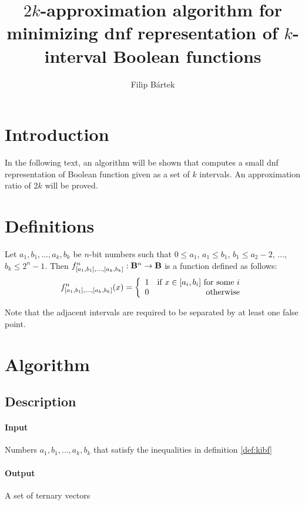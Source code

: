 \documentclass{article}
\author{Filip Bártek}
\title{$2k$-approximation algorithm
for minimizing \acrshort{dnf} representation
of $k$-interval Boolean functions}
\begin{document}
\maketitle

\section{Introduction}
In the following text,
an algorithm will be shown that computes
a small \acrshort{dnf} representation
of Boolean function given as a set of $k$ intervals.
An approximation ratio of $2k$ will be proved.

\section{Definitions}

\begin{definition}
\label{def:kibf}
Let $a_1, b_1, \ldots, a_k, b_k$ be $n$-bit numbers
such that $0 \leq a_1$,
$a_1 \leq b_1$,
$b_1 \leq a_2 - 2$,
$\ldots$,
$b_k \leq 2^n - 1$.
Then $f^n_{[a_1, b_1], \ldots, [a_k, b_k]}: \mathbf{B}{}^n \rightarrow \mathbf{B}{}$ is a function defined as follows:
\[f^n_{\interval{a_1}{b_1}, \ldots, \interval{a_k}{b_k}} (x) = \left\{
  \begin{array}{lr}
    1 & $if $ x \in \interval{a_i}{b_i}$ for some $i\\
    0 & $otherwise$
  \end{array}
\right.
\]
\end{definition}
Note that the adjacent intervals
are required to be separated by at least one false point.

\section{Algorithm}

\subsection{Description}
\paragraph{Input}
Numbers $a_1, b_1, \ldots, a_k, b_k$
that satisfy the inequalities in definition \ref{def:kibf}

\paragraph{Output}
A set of ternary vectors
\end{document}
